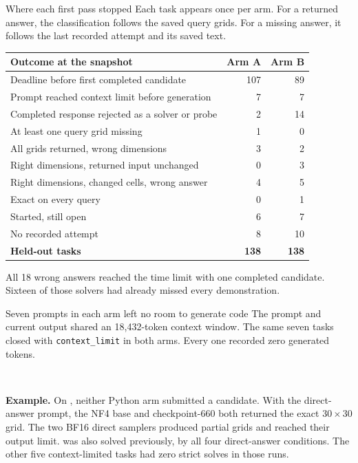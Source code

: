 \begin{frame}[t]{Where each first pass stopped}
\smallbody Each task appears once per arm. For a returned answer, the classification follows the saved query grids. For a missing answer, it follows the last recorded attempt and its saved text.
\par\vspace{2mm}
\begin{center}
\smallbody\renewcommand{\arraystretch}{.99}\begin{tabular}{@{}lrr@{}}
\toprule
Outcome at the snapshot & Arm A & Arm B\\
\midrule
Deadline before first completed candidate & 107 & 89\\
Prompt reached context limit before generation & 7 & 7\\
Completed response rejected as a solver or probe & 2 & 14\\
\addlinespace
At least one query grid missing & 1 & 0\\
All grids returned, wrong dimensions & 3 & 2\\
Right dimensions, returned input unchanged & 0 & 3\\
Right dimensions, changed cells, wrong answer & 4 & 5\\
Exact on every query & 0 & 1\\
\addlinespace
Started, still open & 6 & 7\\
No recorded attempt & 8 & 10\\
\midrule
\textbf{Held-out tasks} & \textbf{138} & \textbf{138}\\
\bottomrule\end{tabular}
\end{center}
\vfill
\smallbody All 18 wrong answers reached the time limit with one completed candidate. Sixteen of those solvers had already missed every demonstration.
\end{frame}

\begin{frame}[t]{Seven prompts in each arm left no room to generate code}
\normbody
The prompt and current output shared an 18,432-token context window. The same seven tasks closed with \texttt{context\_limit} in both arms. Every one recorded zero generated tokens.
\par\vspace{5mm}
\med
{}\quad{}\quad{}\quad{}\\[2mm]
\quad{}\quad{}
\par\vspace{6mm}
\med\textbf{Example.} On , neither Python arm submitted a candidate. With the direct-answer prompt, the NF4 base and checkpoint-660 both returned the exact $30\times30$ grid. The two BF16 direct samplers produced partial grids and reached their output limit.
\vfill
\smallbody {} was also solved previously, by all four direct-answer conditions. The other five context-limited tasks had zero strict solves in those runs.
\end{frame}

